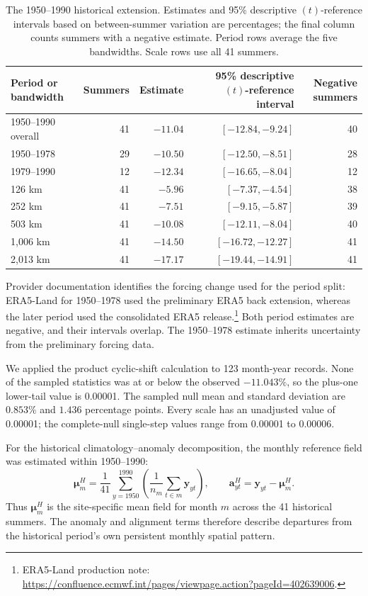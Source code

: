 \documentclass[namedate,webpdf,modern,mediumone]{oup-authoring-template}
\theoremstyle{thmstyleone}
\begin{document}
\begin{table}[htbp]
\centering
\caption{The 1950--1990 historical extension. Estimates and 95\% descriptive
$(t)$-reference intervals based on between-summer variation are percentages;
the final column counts summers with a negative estimate. Period rows average
the five bandwidths. Scale rows use all 41 summers.}
\label{tab:historical-extension}
\small
\setlength{\tabcolsep}{7pt}
\begin{tabular}{lrrrr}
\toprule
Period or bandwidth & Summers & Estimate & 95\% descriptive $(t)$-reference interval & Negative summers \\
\midrule
1950--1990 overall & 41 & $-11.04$ & $[-12.84,-9.24]$ & 40 \\
1950--1978 & 29 & $-10.50$ & $[-12.50,-8.51]$ & 28 \\
1979--1990 & 12 & $-12.34$ & $[-16.65,-8.04]$ & 12 \\
\midrule
126 km   & 41 & $-5.96$  & $[-7.37,-4.54]$   & 38 \\
252 km   & 41 & $-7.51$  & $[-9.15,-5.87]$   & 39 \\
503 km   & 41 & $-10.08$ & $[-12.11,-8.04]$  & 40 \\
1,006 km & 41 & $-14.50$ & $[-16.72,-12.27]$ & 41 \\
2,013 km & 41 & $-17.17$ & $[-19.44,-14.91]$ & 41 \\
\bottomrule
\end{tabular}
\end{table}

Provider documentation identifies the forcing change used for the period
split: ERA5-Land for 1950--1978 used the preliminary ERA5 back extension,
whereas the later period used the consolidated ERA5 release.\footnote{ERA5-Land
production note:
\url{https://confluence.ecmwf.int/pages/viewpage.action?pageId=402639006}.}
Both period estimates are negative, and their intervals overlap. The
1950--1978 estimate inherits uncertainty from the preliminary forcing data.

We applied the product cyclic-shift calculation to 123 month-year records. None of the
sampled statistics was at or below the observed $-11.043\%$, so the plus-one
lower-tail value is 0.00001. The sampled null mean and standard deviation are
$0.853\%$ and $1.436$ percentage points. Every scale has an unadjusted value
of 0.00001; the complete-null single-step values range from 0.00001 to
0.00006.

For the historical climatology--anomaly decomposition, the monthly
reference field was estimated within 1950--1990:
\[
 \boldsymbol\mu_m^{H}=\frac{1}{41}\sum_{y=1950}^{1990}
 \left(\frac{1}{n_m}\sum_{t\in m}\mathbf y_{yt}\right),
 \qquad
 \mathbf a_{yt}^{H}=\mathbf y_{yt}-\boldsymbol\mu_m^{H}.
\]
Thus $\boldsymbol\mu_m^{H}$ is the site-specific mean field for month $m$
across the 41 historical summers. The anomaly and
alignment terms therefore describe departures from the historical period's
own persistent monthly spatial pattern.
\end{document}
